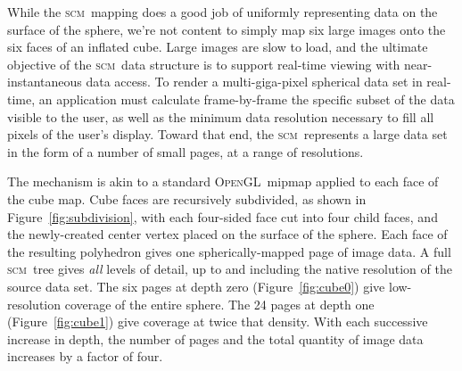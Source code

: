 \documentclass[oneside,10pt]{memoir}
\newcommand{\opengl}  {\textsc{OpenGL}}
\newcommand{\scm}     {\textsc{scm}}
\begin{document}
\begin{Spacing}{1.1}
While the \scm\ mapping does a good job of uniformly representing data on the surface of the sphere, we're not content to simply map six large images onto the six faces of an inflated cube. Large images are slow to load, and the ultimate objective of the \scm\ data structure is to support real-time viewing with near-instantaneous data access. To render a multi-giga-pixel spherical data set in real-time, an application must calculate frame-by-frame the specific subset of the data visible to the user, as well as the minimum data resolution necessary to fill all pixels of the user's display. Toward that end, the \scm\ represents a large data set in the form of a number of small pages, at a range of resolutions.

The mechanism is akin to a standard \opengl\ mipmap applied to each face of the cube map. Cube faces are recursively subdivided, as shown in Figure~\ref{fig:subdivision}, with each four-sided face cut into four child faces, and the newly-created center vertex placed on the surface of the sphere. Each face of the resulting polyhedron gives one spherically-mapped page of image data. A full \scm\ tree gives \emph{all} levels of detail, up to and including the native resolution of the source data set. The six pages at depth zero (Figure~\ref{fig:cube0}) give low-resolution coverage of the entire sphere. The 24 pages at depth one (Figure~\ref{fig:cube1}) give coverage at twice that density. With each successive increase in depth, the number of pages and the total quantity of image data increases by a factor of four.


\end{Spacing}
\end{document}
